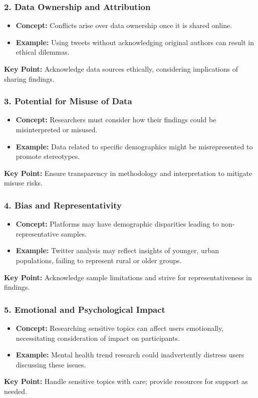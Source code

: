 \documentclass{beamer}
\begin{document}
\begin{frame}[fragile]
    \frametitle{2. Data Ownership and Attribution}
    \begin{itemize}
        \item \textbf{Concept:} Conflicts arise over data ownership once it is shared online.
        \item \textbf{Example:} Using tweets without acknowledging original authors can result in ethical dilemmas.
    \end{itemize}
    \textbf{Key Point:} Acknowledge data sources ethically, considering implications of sharing findings.
\end{frame}

\begin{frame}[fragile]
    \frametitle{3. Potential for Misuse of Data}
    \begin{itemize}
        \item \textbf{Concept:} Researchers must consider how their findings could be misinterpreted or misused.
        \item \textbf{Example:} Data related to specific demographics might be misrepresented to promote stereotypes.
    \end{itemize}
    \textbf{Key Point:} Ensure transparency in methodology and interpretation to mitigate misuse risks.
\end{frame}

\begin{frame}[fragile]
    \frametitle{4. Bias and Representativity}
    \begin{itemize}
        \item \textbf{Concept:} Platforms may have demographic disparities leading to non-representative samples.
        \item \textbf{Example:} Twitter analysis may reflect insights of younger, urban populations, failing to represent rural or older groups.
    \end{itemize}
    \textbf{Key Point:} Acknowledge sample limitations and strive for representativeness in findings.
\end{frame}

\begin{frame}[fragile]
    \frametitle{5. Emotional and Psychological Impact}
    \begin{itemize}
        \item \textbf{Concept:} Researching sensitive topics can affect users emotionally, necessitating consideration of impact on participants.
        \item \textbf{Example:} Mental health trend research could inadvertently distress users discussing these issues.
    \end{itemize}
    \textbf{Key Point:} Handle sensitive topics with care; provide resources for support as needed.
\end{frame}
\end{document}
